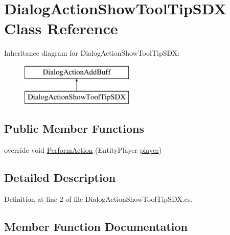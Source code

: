 \hypertarget{class_dialog_action_show_tool_tip_s_d_x}{}\section{Dialog\+Action\+Show\+Tool\+Tip\+S\+DX Class Reference}
\label{class_dialog_action_show_tool_tip_s_d_x}
Inheritance diagram for Dialog\+Action\+Show\+Tool\+Tip\+S\+DX\+:\begin{figure}[H]
\begin{center}
\leavevmode
\includegraphics[height=2.000000cm]{class_dialog_action_show_tool_tip_s_d_x}
\end{center}
\end{figure}
\subsection*{Public Member Functions}
\begin{DoxyCompactItemize}
\item 
override void \mbox{\hyperlink{class_dialog_action_show_tool_tip_s_d_x_aa9ff0bbc5471f3305f0d8ebf9c37e149}{Perform\+Action}} (Entity\+Player \mbox{\hyperlink{_sphere_i_i_01_music_01_boxes_2_config_2_localization_8txt_a4e2cb8aeff651600ea1cc57fe5a929a4}{player}})
\end{DoxyCompactItemize}


\subsection{Detailed Description}


Definition at line 2 of file Dialog\+Action\+Show\+Tool\+Tip\+S\+D\+X.\+cs.



\subsection{Member Function Documentation}
\mbox{\label{class_dialog_action_show_tool_tip_s_d_x_aa9ff0bbc5471f3305f0d8ebf9c37e149}} 

